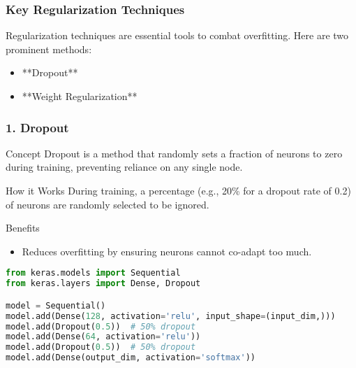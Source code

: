 \documentclass[aspectratio=169]{beamer}
\begin{document}
\begin{frame}[fragile]
    \frametitle{Key Regularization Techniques}
    Regularization techniques are essential tools to combat overfitting. Here are two prominent methods:
    \begin{itemize}
        \item **Dropout**
        \item **Weight Regularization**
    \end{itemize}
\end{frame}

\begin{frame}[fragile]
    \frametitle{1. Dropout}
    \begin{block}{Concept}
        Dropout is a method that randomly sets a fraction of neurons to zero during training, preventing reliance on any single node.
    \end{block}
    
    \begin{block}{How it Works}
        During training, a percentage (e.g., 20\% for a dropout rate of 0.2) of neurons are randomly selected to be ignored.
    \end{block}

    \begin{block}{Benefits}
        \begin{itemize}
            \item Reduces overfitting by ensuring neurons cannot co-adapt too much.
        \end{itemize}
    \end{block}
    
    \begin{lstlisting}[language=Python]
from keras.models import Sequential
from keras.layers import Dense, Dropout

model = Sequential()
model.add(Dense(128, activation='relu', input_shape=(input_dim,)))
model.add(Dropout(0.5))  # 50% dropout
model.add(Dense(64, activation='relu'))
model.add(Dropout(0.5))  # 50% dropout
model.add(Dense(output_dim, activation='softmax'))
    \end{lstlisting}
\end{frame}
\end{document}
